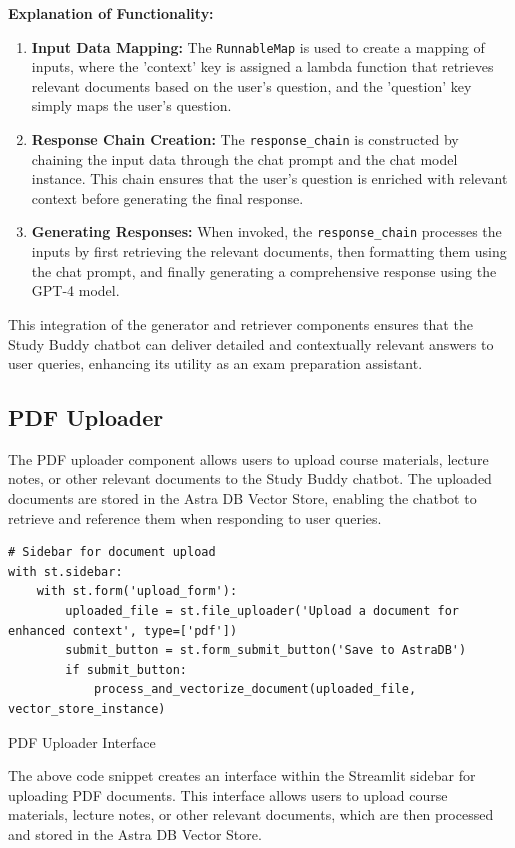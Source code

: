 \textbf{Explanation of Functionality:}
\begin{enumerate}
    \item \textbf{Input Data Mapping:} The \texttt{RunnableMap} is used to create a mapping of inputs, where the 'context' key is assigned a lambda function that retrieves relevant documents based on the user's question, and the 'question' key simply maps the user's question.
    \item \textbf{Response Chain Creation:} The \texttt{response\_chain} is constructed by chaining the input data through the chat prompt and the chat model instance. This chain ensures that the user's question is enriched with relevant context before generating the final response.
    \item \textbf{Generating Responses:} When invoked, the \texttt{response\_chain} processes the inputs by first retrieving the relevant documents, then formatting them using the chat prompt, and finally generating a comprehensive response using the GPT-4 model.
\end{enumerate}

This integration of the generator and retriever components ensures that the Study Buddy chatbot can deliver detailed and contextually relevant answers to user queries, enhancing its utility as an exam preparation assistant.

\subsection{PDF Uploader}
The PDF uploader component allows users to upload course materials, lecture notes, or other relevant documents to the Study Buddy chatbot. The uploaded documents are stored in the Astra DB Vector Store, enabling the chatbot to retrieve and reference them when responding to user queries.

\begin{listing}[H]
\begin{verbatim}
# Sidebar for document upload
with st.sidebar:
    with st.form('upload_form'):
        uploaded_file = st.file_uploader('Upload a document for enhanced context', type=['pdf'])
        submit_button = st.form_submit_button('Save to AstraDB')
        if submit_button:
            process_and_vectorize_document(uploaded_file, vector_store_instance)
\end{verbatim}
\caption{PDF Uploader Interface}
\label{listing:PDF_Uploader}
\end{listing}
The above code snippet creates an interface within the Streamlit sidebar for uploading PDF documents. This interface allows users to upload course materials, lecture notes, or other relevant documents, which are then processed and stored in the Astra DB Vector Store.

